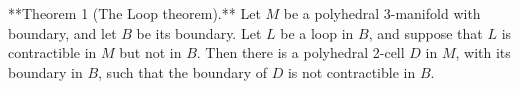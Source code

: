 **Theorem 1 (The Loop theorem).** Let $M$ be a polyhedral 3-manifold with boundary, and let $B$ be its boundary. Let $L$ be a loop in $B$, and suppose that $L$ is contractible in $M$ but not in $B$. Then there is a polyhedral 2-cell $D$ in $M$, with its boundary in $B$, such that the boundary of $D$ is not contractible in $B$.
